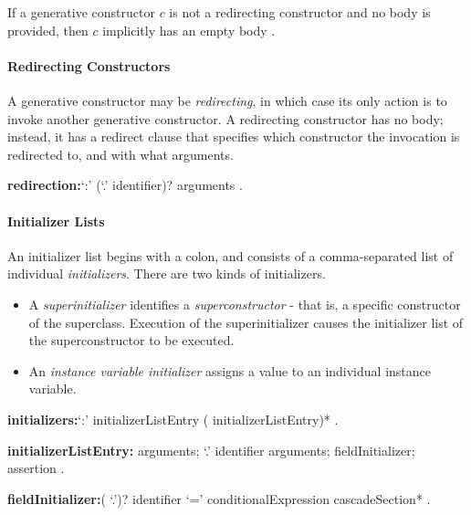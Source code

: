 \documentclass{article}
\begin{document}

\LMHash{}
If a generative constructor $c$ is not a redirecting constructor and no body is provided, then $c$ implicitly has an empty body \code{\{\}}.


\paragraph{Redirecting Constructors}

\LMHash{}
A generative constructor may be {\em redirecting}, in which case its only action is to invoke another generative constructor.
A redirecting constructor has no body; instead, it has a redirect clause that specifies which constructor the invocation is redirected to, and with what arguments.

\begin{grammar}
{\bf redirection:}`{\escapegrammar :}' \THIS{} (`{\escapegrammar .}' identifier)? arguments
  .
\end{grammar}


\paragraph{Initializer Lists}

\LMHash{}
An initializer list begins with a colon, and consists of a comma-separated list of individual {\em initializers}.
There are two kinds of initializers.
\begin{itemize}
\item A {\em superinitializer} identifies a {\em superconstructor} - that is, a specific constructor of the superclass.
Execution of the superinitializer causes the initializer list of the superconstructor to be executed.
\item An {\em instance variable initializer} assigns a value to an individual instance variable.
\end{itemize}

\begin{grammar}
{\bf initializers:}`{\escapegrammar :}' initializerListEntry (\gcomma{} initializerListEntry)*
  .

{\bf initializerListEntry:}\SUPER{} arguments;
  \SUPER{} `{\escapegrammar .}' identifier arguments;
  fieldInitializer;
  assertion
  .

{\bf fieldInitializer:}(\THIS{} `{\escapegrammar .}')? identifier `=' conditionalExpression cascadeSection*
  .
\end{grammar}
\end{document}
